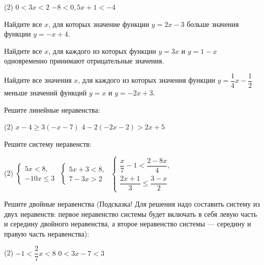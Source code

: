 \begin{class}[number=6]
\begin{listofex}[resume]
		\begin{tasks}(2)
			\task \( 0<3x<2 \)
			\task \( -8<0,5x+1<-4 \)
		\end{tasks} 
		\item Найдите все \( x \), для которых значение функции \( y=2x-3 \) больше значения функции \( y=-x+4 \).
		\item Найдите все \( x \), для каждого из которых функции \( y=3x \) и \( y=1-x \) одновременно принимают отрицательные значения.
		\item Найдите все значения \( x \), для каждого из которых значения функции \( y=\dfrac{1}{4}x-\dfrac{1}{2} \) меньше значений функций \( y=x \) и \( y=-2x+3 \).
	\end{listofex}
\end{class}

\begin{homework}[number=3]
	\begin{listofex}
		\item Решите линейные неравенства:
		\begin{tasks}(2)
			\task \( x-4\geq3(-x-7) \)
			\task \( 4-2(-2x-2)>2x+5 \)
		\end{tasks}
		\item Решите систему неравенств:
		\begin{tasks}(2)
			\task \( \left\{
			\begin{array}{l}
				5x<8,\\
				-10x\leq3
			\end{array}
			\right. \)
			\task \( \left\{
			\begin{array}{l}
				5x+3<8,\\
				7-3x>2
			\end{array}
			\right. \)
			\task \( \left\{
			\begin{array}{l}
				\dfrac{x}{7}-1<\dfrac{2-8x}{4},\\[1em]
				\dfrac{2x+1}{3}\leq\dfrac{3-x}{2}
			\end{array}
			\right. \)
		\end{tasks}
		\item Решите двойные неравенства (Подсказка! Для решения надо составить систему из двух неравенств: первое неравенство системы будет включать в себя левую часть и середину двойного неравенства, а второе неравенство системы --- середину и правую часть неравенства):
		\begin{tasks}(2)
			\task \( -1<\dfrac{2}{7}x<8 \)
			\task \( 0<3x-7<3 \)
		\end{tasks}
	\end{listofex}
\end{homework}

